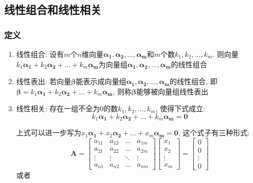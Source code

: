 \subsection{线性组合和线性相关}
\subsubsection{定义}
\begin{enumerate}
	\item 线性组合: 设有$ m $个$ n $维向量$ \bm{\alpha_{1}},\bm{\alpha_{2}},...,\bm{\alpha_{m}} $和$ m $个数$ k_{1},k_{2},...,k_{m} $. 则向量$ k_{1}\bm{\alpha_{1}}+k_{2}\bm{\alpha_{2}}+...+k_{m}\bm{\alpha_{m}} $为向量组$ \bm{\alpha_{1}},\bm{\alpha_{2}},...,\bm{\alpha_{m}} $的线性组合
	\item 线性表出: 若向量$ \bm{\beta} $能表示成向量组$ \bm{\alpha_{1}},\bm{\alpha_{2}},...,\bm{\alpha_{m}} $的线性组合, 即$ \bm{\beta}=k_{1}\bm{\alpha_{1}}+k_{2}\bm{\alpha_{2}}+...+k_{m}\bm{\alpha_{m}} $, 则称$ \bm{\beta} $能够被向量组线性表出
	\item 线性相关: 存在一组不全为$ 0 $的数$ k_{1},k_{2},...,k_{m} $, 使得下式成立:
	\begin{equation*}
		k_{1}\bm{\alpha_{1}}+k_{2}\bm{\alpha_{2}}+...+k_{m}\bm{\alpha_{m}}=\bm{0}
	\end{equation*}\par
    上式可以进一步写为$ x_{1}\bm{\alpha_{1}}+x_{2}\bm{\alpha_{2}}+...+x_{m}\bm{\alpha_{m}}=\bm{0} $, 这个式子有三种形式:
    \begin{equation*}
    	\bm{A}=\begin{bmatrix}
    		a_{11} & a_{12} & \dots & a_{1m} \\
    		a_{21} & a_{22} & \dots & a_{2m} \\
    		\vdots & \vdots & \ddots & \vdots \\
    		a_{n1} & a_{n2} & \dots & a_{nm}
    	\end{bmatrix}
    \begin{bmatrix}
    	x_{1} \\
    	x_{2} \\
    	\vdots \\
    	x_{m}
    \end{bmatrix}=
\begin{bmatrix}
	0 \\
	0 \\
	\vdots \\
	0
\end{bmatrix}
\end{equation*}
或者
\begin{equation*}

\end{equation*}
\end{enumerate}

